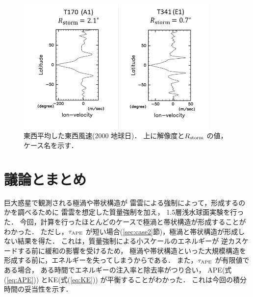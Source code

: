 \documentclass[a4j,12pt,openbib,oneside]{jreport}
\begin{document}
%
%
\begin{figure}[ht]
  \begin{center}
    \includegraphics[clip,width=10cm]{./fig/result/case4/case4_vellon.png}
    \caption{
      \footnotesize{東西平均した東西風速(2000 地球日)．
上に解像度と$R_{\rm{storm}}$ の値，ケース名を示す．
      }
    }
    \label{fig:case4_vellon}
  \end{center}
\end{figure}
%

%
%
\def\chap4{議論とまとめ}
\chapter{\chap4}
\label{chap:4}
\markright{4 \chap4}
%
%
巨大惑星で観測される極渦や帯状構造が
雷雲による強制によって，形成するのかを調べるために
雷雲を想定した質量強制を加え，
1.5層浅水球面実験を行った．
%
今回，計算を行ったほとんどのケースで極渦と帯状構造が形成することがわかった．
%
ただし，$\tau_{\rm{APE}}$ が短い場合(\ref{sec:case2}節)，極渦と帯状構造が形成しない結果を得た．
これは，質量強制による小スケールのエネルギーが
逆カスケードする前に緩和の影響を受けるため，
極渦や帯状構造といった大規模構造を
形成する前に，エネルギーを失ってしまうからである．
また，$\tau_{\rm{APE}}$ が有限値である場合，
ある時間でエネルギーの注入率と除去率がつり合い，
APE(式(\ref{eq:APE})) とKE(式(\ref{eq:KE})) が平衡することがわかった．
これは今回の積分時間の妥当性を示す．
\end{document}
